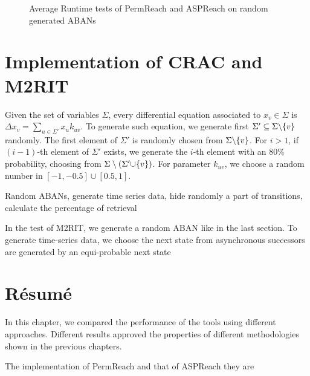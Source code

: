 \begin{figure}[ht]
    \caption[Runtime tests of reachability analyzers]{Average Runtime tests of PermReach and ASPReach on random generated ABANs}
\end{figure}

\section{Implementation of CRAC and M2RIT}

Given the set of variables $\Sigma$, every differential equation associated to $x_v\in \Sigma$ is $\Delta x_v=\sum_{u\in \Sigma'}x_u k_{uv}$. 
To generate such equation, we generate first $\Sigma'\subseteq \Sigma\miset{v}$ randomly.
The first element of $\Sigma'$ is randomly chosen from $\Sigma\miset{v}$.
For $i>1$, if $(i-1)$-th element of $\Sigma'$ exists, we generate the $i$-th element with an 80\% probability, choosing from $\Sigma\setminus(\Sigma'\addset{v})$.
For parameter $k_{uv}$, we choose a random number in $[-1,-0.5]\cup[0.5,1]$.

Random ABANs, generate time series data, hide randomly a part of transitions, calculate the percentage of retrieval

In the test of M2RIT, we generate a random ABAN like in the last section.
To generate time-series data, we choose the next state from asynchronous successors are generated by an equi-probable next state
\section{R\'esum\'e}

In this chapter, we compared the performance of the tools using different approaches.
Different results approved the properties of different methodologies shown in the previous chapters.

The implementation of PermReach and that of ASPReach they are 